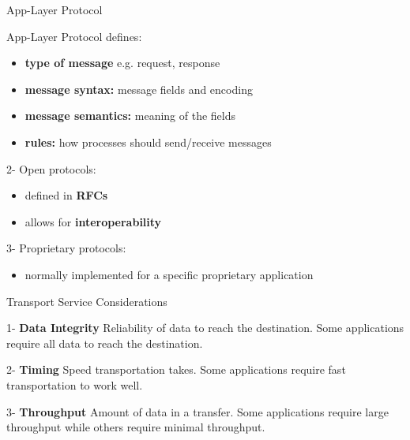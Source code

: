 \begin{topic}{App-Layer Protocol}

App-Layer Protocol defines:
\begin{itemize}
	\item \textbf{type of message} e.g. request, response
	\item \textbf{message syntax:} message fields and encoding
	\item \textbf{message semantics:} meaning of the fields
	\item \textbf{rules:} how processes should send/receive messages
\end{itemize}

\begin{subtopic}{2-}
Open protocols:
\begin{itemize}
	\item defined in \textbf{RFCs}
	\item allows for \textbf{interoperability}
\end{itemize}
\end{subtopic}

\begin{subtopic}{3-}
Proprietary protocols:
\begin{itemize}
	\item normally implemented for a specific proprietary application
\end{itemize}
\end{subtopic}

\end{topic}

\begin{topic}{Transport Service Considerations}

\begin{subtopic}{1-}
\textbf{Data Integrity}
Reliability of data to reach the destination.
Some applications require all data to reach the destination.
\end{subtopic}

\begin{subtopic}{2-}
\textbf{Timing}
Speed transportation takes.
Some applications require fast transportation to work well.
\end{subtopic}

\begin{subtopic}{3-}
\textbf{Throughput}
Amount of data in a transfer.
Some applications require large throughput while others require minimal throughput.
\end{subtopic}

\end{topic}

